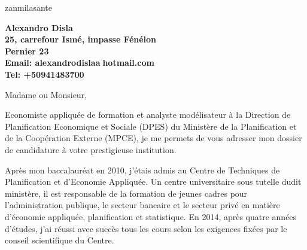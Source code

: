 \documentclass[11pt]{letter} %
\begin{document}

\begin{letter}{zanmilasante} 


\begin{center}
\large\bf Alexandro Disla\\ %
25, carrefour Ism\'{e}, impasse F\'{e}n\'{e}lon\\ Pernier 23 \\ %
Email: alexandrodisla\textcircled{a}hotmail.com \\
Tel: +50941483700
\end{center} 
\vfill

\signature{Alexandro Disla} %


\opening{Madame ou Monsieur,} 


	Economiste appliquée de formation et analyste modélisateur à la Direction de Planification Economique et Sociale (DPES) du Ministère de la Planification et de la Coopération Externe (MPCE), je me permets de vous adresser mon dossier de candidature à votre prestigieuse institution.
	
	Après mon baccalauréat en 2010, j’étais admis au Centre de Techniques de Planification et d’Economie Appliquée. Un centre universitaire sous tutelle dudit ministère, il est responsable de la formation de jeunes cadres pour l’administration publique, le secteur bancaire et le secteur privé en matière d’économie appliquée, planification et statistique. En 2014, après quatre années d’études, j’ai réussi avec succès tous les cours selon les exigences fixées par le conseil scientifique du Centre.
	

\end{letter}
\end{document}
